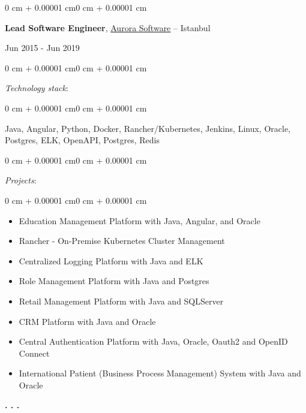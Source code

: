 \documentclass[10pt, letterpaper]{article}
\newenvironment{highlights}{
    \begin{itemize}[
        topsep=0.10 cm,
        parsep=0.10 cm,
        partopsep=0pt,
        itemsep=0pt,
        leftmargin=0 cm + 10pt]
}{
    \end{itemize}} %
\newenvironment{onecolentry}{
    \begin{adjustwidth}{0 cm + 0.00001 cm}{0 cm + 0.00001 cm}
}{
    \end{adjustwidth}}
\newenvironment{twocolentry}[2][]{
    \onecolentry
    \def\secondColumn{#2}
    \setcolumnwidth{\fill, 4.5 cm}
    \begin{paracol}{2}
}{
    \switchcolumn \raggedleft \secondColumn
    \end{paracol}
    \endonecolentry
} %
\begin{document}
        \begin{twocolentry}{Jun 2015 - Jun 2019}
            \textbf{Lead Software Engineer}, \href{https://www.aurorabilisim.com/}{Aurora Software} -- Istanbul
        \end{twocolentry}
            \begin{onecolentry}
                \textit{Technology stack}:
            \end{onecolentry}
            \begin{onecolentry}
                \begin{highlights}
                    Java, Angular, Python, Docker, Rancher/Kubernetes, Jenkins, Linux, Oracle, Postgres, ELK, OpenAPI, Postgres, Redis
                \end{highlights}
            \end{onecolentry}
            \vspace{0.2 cm}
            \begin{onecolentry}
                \textit{Projects}:
            \end{onecolentry}
            \begin{onecolentry}
                \begin{highlights}
                    \item Education Management Platform with Java, Angular, and Oracle
                    \item Rancher - On-Premise Kubernetes Cluster Management
                    \item Centralized Logging Platform with Java and ELK
                    \item Role Management Platform with Java and Postgres
                    \item Retail Management Platform with Java and SQLServer
                    \item CRM Platform with Java and Oracle
                    \item Central Authentication Platform with Java, Oracle, Oauth2 and OpenID Connect
                    \item International Patient (Business Process Management) System with Java and Oracle
                \end{highlights}
            \end{onecolentry}
            \vspace{0.5 cm}

        \begin{center}
            \textbf{. . .}
        \end{center}
\end{document}

